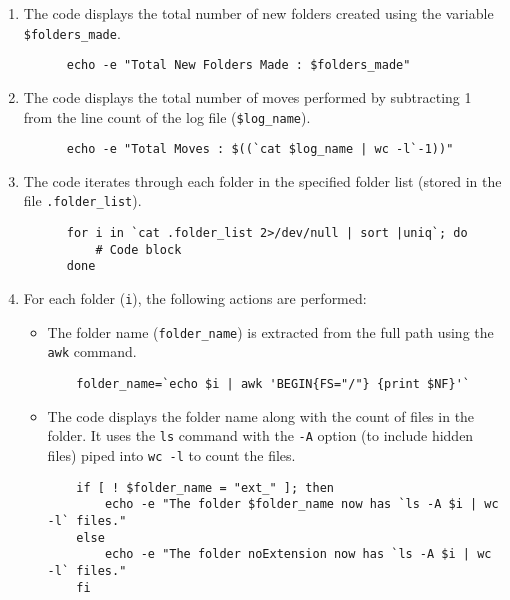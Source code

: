 \documentclass[12pt]{article}
\begin{document}
    \begin{enumerate}
      \item The code displays the total number of new folders created using the variable \texttt{\$folders\_made}.
      
      \begin{verbatim}
      echo -e "Total New Folders Made : $folders_made"
      \end{verbatim}
      
      \item The code displays the total number of moves performed by subtracting 1 from the line count of the log file (\texttt{\$log\_name}).
      
      \begin{verbatim}
      echo -e "Total Moves : $((`cat $log_name | wc -l`-1))"
      \end{verbatim}
      
      \item The code iterates through each folder in the specified folder list (stored in the file \texttt{.folder\_list}).
      
      \begin{verbatim}
      for i in `cat .folder_list 2>/dev/null | sort |uniq`; do
          # Code block
      done
      \end{verbatim}
      
      \item For each folder (\texttt{i}), the following actions are performed:
        \begin{itemize}
          \item The folder name (\texttt{folder\_name}) is extracted from the full path using the \texttt{awk} command.
          
          \begin{verbatim}
    folder_name=`echo $i | awk 'BEGIN{FS="/"} {print $NF}'`
          \end{verbatim}
          
          \item The code displays the folder name along with the count of files in the folder. It uses the \texttt{ls} command with the \texttt{-A} option (to include hidden files) piped into \texttt{wc -l} to count the files.
          
          \begin{verbatim}
    if [ ! $folder_name = "ext_" ]; then
        echo -e "The folder $folder_name now has `ls -A $i | wc -l` files."
    else
        echo -e "The folder noExtension now has `ls -A $i | wc -l` files."
    fi
          \end{verbatim}
        \end{itemize}
    \end{enumerate}
    
\end{document}
